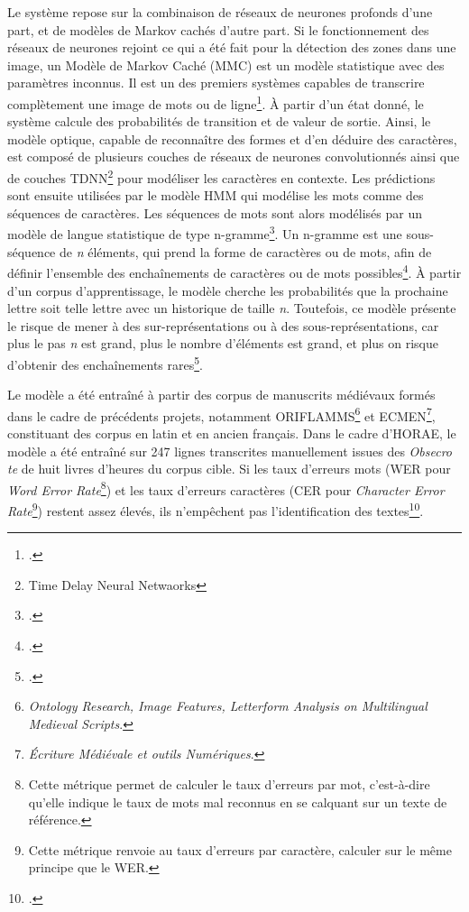\documentclass[a4paper,12pt,twoside]{book}
\begin{document}
	Le système repose sur la combinaison de réseaux de neurones profonds d'une part, et de modèles de Markov cachés d'autre part. Si le fonctionnement des réseaux de neurones rejoint ce qui a été fait pour la détection des zones dans une image, un Modèle de Markov Caché (MMC) est un modèle statistique avec des paramètres inconnus. Il est un des premiers systèmes capables de transcrire complètement une image de mots ou de ligne\footcite[p. 66]{Reconnaissance_HTR_These}. À partir d'un état donné, le système calcule des probabilités de transition et de valeur de sortie. Ainsi, le modèle optique, capable de reconnaître des formes et d'en déduire des caractères, est composé de plusieurs couches de réseaux de neurones convolutionnés ainsi que de couches TDNN\footnote{Time Delay Neural Netwaorks} pour modéliser les caractères en contexte. Les prédictions sont ensuite utilisées par le modèle HMM qui modélise les mots comme des séquences de caractères. Les séquences de mots sont alors modélisés par un modèle de langue statistique de type n-gramme\footcite[p. 24]{Seg_Livres_Heures}. Un n-gramme est une sous-séquence de \textit{n} éléments, qui prend la forme de caractères ou de mots, afin de définir l'ensemble des enchaînements de caractères ou de mots possibles\footcite[p. 66]{Reconnaissance_HTR_These}. À partir d'un corpus d'apprentissage, le modèle cherche les probabilités que la prochaine lettre soit telle lettre avec un historique de taille \textit{n}. Toutefois, ce modèle présente le risque de mener à des sur-représentations ou à des sous-représentations, car plus le pas \textit{n} est grand, plus le nombre d’éléments est grand, et plus on risque d’obtenir des enchaînements rares\footcite[p. 65]{Reconnaissance_HTR_These}.
	
	Le modèle a été entraîné à partir des corpus de manuscrits médiévaux formés dans le cadre de précédents projets, notamment ORIFLAMMS\footnote{\textit{Ontology Research, Image Features, Letterform Analysis on Multilingual Medieval Scripts}.} et ECMEN\footnote{\textit{Écriture Médiévale et outils Numériques}.}, constituant des corpus en latin et en ancien français. Dans le cadre d'HORAE, le modèle a été entraîné sur 247 lignes transcrites manuellement issues des \textit{Obsecro te} de huit livres d'heures du corpus cible. Si les taux d'erreurs mots (WER pour \textit{Word Error Rate}\footnote{Cette métrique permet de calculer le taux d'erreurs par mot, c'est-à-dire qu'elle indique le taux de mots mal reconnus en se calquant sur un texte de référence.}) et les taux d'erreurs caractères (CER pour \textit{Character Error Rate}\footnote{Cette métrique renvoie au taux d'erreurs par caractère, calculer sur le même principe que le WER.}) restent assez élevés, ils n'empêchent pas l'identification des textes\footcite[p. 25]{Seg_Livres_Heures}. \\
	
\end{document}
